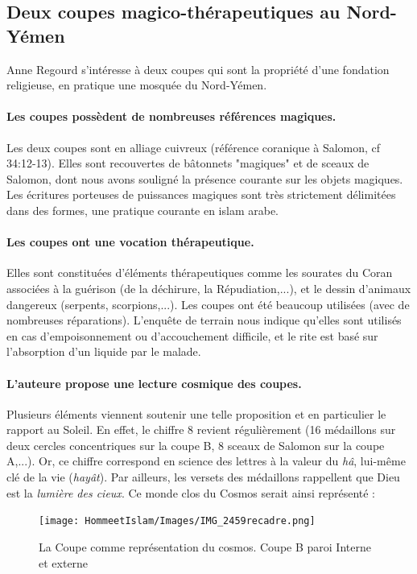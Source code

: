 \subsection*{Deux coupes magico-thérapeutiques au Nord-Yémen}

Anne Regourd s'intéresse à deux coupes qui sont la propriété d'une fondation religieuse, en pratique une mosquée du Nord-Yémen.
\paragraph{Les coupes possèdent de nombreuses références magiques.}
Les deux coupes sont en alliage cuivreux (référence coranique à Salomon, cf 34:12-13). Elles  sont recouvertes de bâtonnets "magiques" et de sceaux de Salomon, dont nous avons souligné la présence courante sur les objets magiques. Les écritures porteuses de puissances magiques sont très strictement délimitées dans des formes, une pratique courante en islam arabe. 
\paragraph{Les coupes ont une vocation thérapeutique.}  Elles sont constituées d'éléments thérapeutiques comme les sourates du Coran associées à la guérison (de la déchirure, la Répudiation,...),  et le dessin d'animaux dangereux (serpents, scorpions,...).  Les coupes ont été beaucoup utilisées (avec de nombreuses réparations). L'enquête de terrain nous indique qu'elles sont utilisés en cas d'empoisonnement ou d'accouchement difficile, et le rite est basé sur l'absorption d'un liquide par le malade.


\paragraph{L'auteure propose une lecture cosmique des coupes.}  Plusieurs éléments viennent soutenir une telle proposition et en particulier le rapport au Soleil. En effet, le chiffre 8  revient régulièrement (16 médaillons sur deux cercles concentriques sur la coupe B, 8 sceaux de Salomon sur la coupe A,...). Or, ce chiffre correspond en science des lettres à la valeur  du \textit{hâ}, lui-même clé de la vie (\textit{hayât}). Par ailleurs, les versets des médaillons rappellent que Dieu est la \textit{lumière des cieux}. 
Ce monde clos du Cosmos serait ainsi représenté : 

\begin{figure}[h!]
    \centering
     
\texttt{[image: HommeetIslam/Images/IMG\_2459recadre.png]}
   \caption{La Coupe comme représentation du cosmos. Coupe B paroi Interne et externe}
    \label{fig:my_label}
\end{figure}
 
